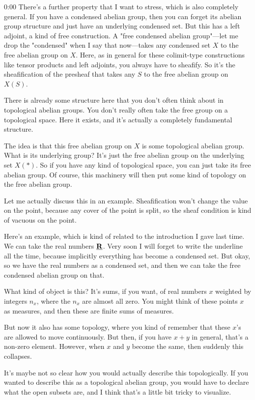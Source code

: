 \begin{unfinished}{0:00}
There's a further property that I want to stress, which is also completely general. If you have a condensed abelian group, then you can forget its abelian group structure and just have an underlying condensed set. But this has a left adjoint, a kind of free construction. A "free condensed abelian group"---let me drop the "condensed" when I say that now---takes any condensed set $X$ to the free abelian group on $X$. Here, as in general for these colimit-type constructions like tensor products and left adjoints, you always have to sheafify. So it's the sheafification of the presheaf that takes any $S$ to the free abelian group on $X(S)$.

There is already some structure here that you don't often think about in topological abelian groups. You don't really often take the free group on a topological space. Here it exists, and it's actually a completely fundamental structure.

The idea is that this free abelian group on $X$ is some topological abelian group. What is its underlying group? It's just the free abelian group on the underlying set $X(\ast)$. So if you have any kind of topological space, you can just take its free abelian group. Of course, this machinery will then put some kind of topology on the free abelian group.

Let me actually discuss this in an example. Sheafification won't change the value on the point, because any cover of the point is split, so the sheaf condition is kind of vacuous on the point.

Here's an example, which is kind of related to the introduction I gave last time. We can take the real numbers $\underline{\mathbf R}$. Very soon I will forget to write the underline all the time, because implicitly everything has become a condensed set. But okay, so we have the real numbers as a condensed set, and then we can take the free condensed abelian group on that.

What kind of object is this? It's sums, if you want, of real numbers $x$ weighted by integers $n_x$, where the $n_x$ are almost all zero. You might think of these points $x$ as measures, and then these are finite sums of measures.

But now it also has some topology, where you kind of remember that these $x$'s are allowed to move continuously. But then, if you have $x + y$ in general, that's a non-zero element. However, when $x$ and $y$ become the same, then suddenly this collapses.

It's maybe not so clear how you would actually describe this topologically. If you wanted to describe this as a topological abelian group, you would have to declare what the open subsets are, and I think that's a little bit tricky to visualize.


\end{unfinished}
